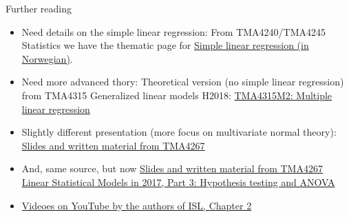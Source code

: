 \documentclass[ignorenonframetext,]{beamer}
\providecommand{\tightlist}{%
  \setlength{\itemsep}{0pt}\setlength{\parskip}{0pt}}
\begin{document}
\begin{frame}{ Further reading }

\begin{itemize}
\tightlist
\item
  Need details on the simple linear regression: From TMA4240/TMA4245
  Statistics we have the thematic page for
  \href{https://wiki.math.ntnu.no/tma4245/tema/begreper/regression}{Simple
  linear regression (in Norwegian)}.
\item
  Need more advanced thory: Theoretical version (no simple linear
  regression) from TMA4315 Generalized linear models H2018:
  \href{https://www.math.ntnu.no/emner/TMA4315/2018h/2MLR.html}{TMA4315M2:
  Multiple linear regression}
\item
  Slightly different presentation (more focus on multivariate normal
  theory):
  \href{https://www.math.ntnu.no/emner/TMA4267/2017v/TMA4267V2017Part2.pdf}{Slides
  and written material from TMA4267}
\item
  And, same source, but now
  \href{http://www.math.ntnu.no/emner/TMA4267/2017v/TMA4267V2017Part3.pdf}{Slides
  and written material from TMA4267 Linear Statistical Models in 2017,
  Part 3: Hypothesis testing and ANOVA}
\item
  \href{https://www.youtube.com/playlist?list=PL5-da3qGB5IBSSCPANhTgrw82ws7w_or9}{Videoes
  on YouTube by the authors of ISL, Chapter 2}
\end{itemize}

\end{frame}
\end{document}
